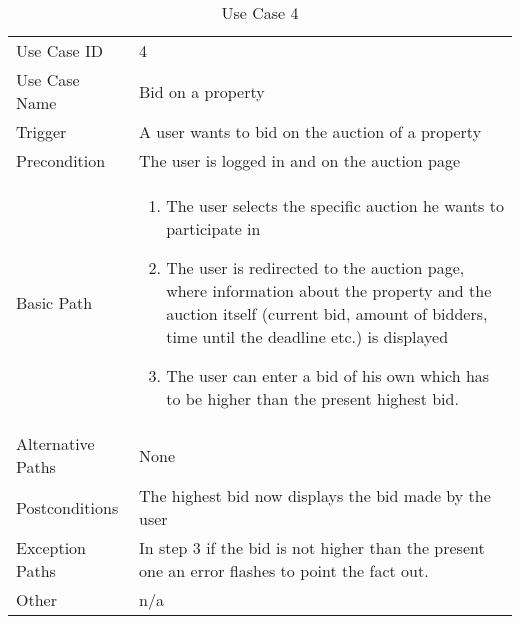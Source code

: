 \begin{table}[H]
\centering
\label{table-use-case-4}
\begin{tabular}{|p{3cm}|p{10cm}}
Use Case ID       & 4                                                         \\
Use Case Name     & Bid on a property                                                          \\
Trigger           & A user wants to bid on the auction of a property                                          \\
Precondition      & The user is logged in and on the auction page                                                  \\
Basic Path        & \begin{enumerate}
\item The user selects the specific auction he wants to participate in
\item The user is redirected to the auction page, where information about the
property and the auction itself (current bid, amount of bidders, time until
the deadline etc.) is displayed
\item The user can enter a bid of his own which has to be higher than the
present highest bid. 
\end{enumerate} 
     \\
Alternative Paths & None                          \\
Postconditions    & The highest bid now displays the bid made by the user                                                       \\
Exception Paths   & In step 3 if the bid is not higher than the present one an error flashes to point the fact out.					\\
Other             & n/a                                                                                                                                                                                                        
\end{tabular}
\caption{Use Case 4}
\end{table}

